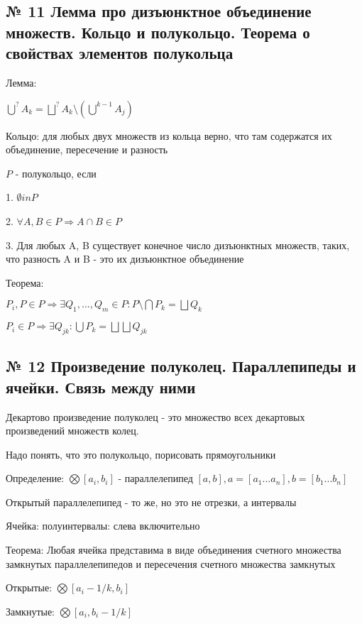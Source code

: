 \documentclass{article}
\begin{document}
\subsection{ \footnotesize № 11 Лемма про дизъюнктное объединение множеств. Кольцо и полукольцо. Теорема о свойствах элементов полукольца}

Лемма:

$\bigcup\limits^?{A_k} = \bigsqcup\limits^?{A_k \setminus (\bigcup\limits^{k - 1}{A_j})}$

Кольцо: для любых двух множеств из кольца верно, что там содержатся их объединение, пересечение и разность

$P$ - полукольцо, если

1. $\emptyset in P$

2. $\forall A, B \in P \Rightarrow A \cap B \in P$

3. Для любых A, B существует конечное число дизъюнктных множеств, таких, что разность A и B - это их дизъюнктное объединение

Теорема:

$P_i, P \in \textit{P} \Rightarrow \exists Q_1, ..., Q_m \in \textit{P} : P \setminus \bigcap{P_k} = \bigsqcup{Q_k}$

$P_i \in \textit{P} \Rightarrow \exists Q_{jk} : \bigcup{P_k} = \bigsqcup{\bigsqcup{Q_{jk}}}$


\subsection{ \footnotesize № 12 Произведение полуколец. Параллепипеды и ячейки. Связь между ними}

Декартово произведение полуколец - это множество всех декартовых произведений множеств колец.

Надо понять, что это полукольцо, порисовать прямоугольники

Определение: $\bigotimes [a_i, b_i]$ - параллелепипед $[a, b], a = [a_1...a_n], b = [b_1...b_n]$

Открытый параллелепипед - то же, но это не отрезки, а интервалы

Ячейка: полуинтервалы: слева включительно

Теорема: Любая ячейка представима в виде объединения счетного множества замкнутых параллелепипедов и пересечения счетного множества замкнутых

Открытые: $\bigotimes{[a_i - 1/k, b_i]}$

Замкнутые: $\bigotimes{[a_i, b_i - 1/k]}$
\end{document}
